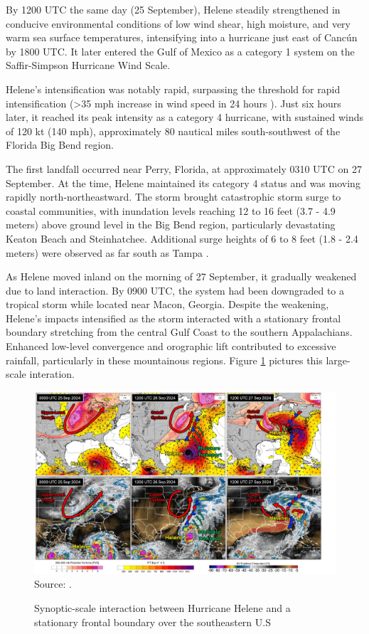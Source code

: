 By 1200 UTC the same day (25 September), Helene steadily strengthened in conducive environmental conditions of low wind shear, high moisture, and very warm sea surface temperatures, intensifying into a hurricane just east of Cancún by 1800 UTC. It later entered the Gulf of Mexico as a category 1 system on the Saffir-Simpson Hurricane Wind Scale.

Helene’s intensification was notably rapid, surpassing the threshold for rapid intensification (>35 mph increase in wind speed in 24 hours \cite{nhc_helene2024}). Just six hours later, it reached its peak intensity as a category 4 hurricane, with sustained winds of 120 kt (140 mph), approximately 80 nautical miles south-southwest of the Florida Big Bend region.

The first landfall occurred near Perry, Florida, at approximately 0310 UTC on 27 September. At the time, Helene maintained its category 4 status and was moving rapidly north-northeastward. The storm brought catastrophic storm surge to coastal communities, with inundation levels reaching 12 to 16 feet (3.7 - 4.9 meters) above ground level in the Big Bend region, particularly devastating Keaton Beach and Steinhatchee. Additional surge heights of 6 to 8 feet (1.8 - 2.4 meters) were observed as far south as Tampa \cite{fsu_helene2024}.

As Helene moved inland on the morning of 27 September, it gradually weakened due to land interaction. By 0900 UTC, the system had been downgraded to a tropical storm while located near Macon, Georgia. Despite the weakening, Helene’s impacts intensified as the storm interacted with a stationary frontal boundary stretching from the central Gulf Coast to the southern Appalachians. Enhanced low-level convergence and orographic lift contributed to excessive rainfall, particularly in these mountainous regions. Figure \ref{fig:synoptic} pictures this large-scale interation.

\begin{figure}[!ht]
	\centering
	\caption{Synoptic-scale interaction between Hurricane Helene and a stationary frontal boundary over the southeastern U.S} %
	\includegraphics[width=\textwidth]{docs/figuras/chapter6/large_scale_helene.png} 
	\vspace{0.5em}
	Source: \cite{nhc_helene20241}.  %
	\label{fig:synoptic} %
\end{figure}

